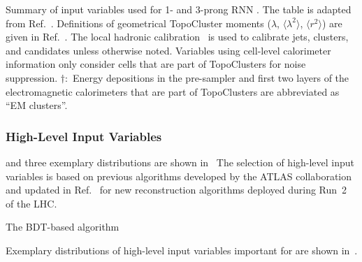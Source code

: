 \begin{table}[htbp]
  \centering

  \caption{Summary of input variables used for 1- and 3-prong RNN
    \tauid. The table is adapted from
    Ref.~\cite{ATL-PHYS-PUB-2019-033}. Definitions of geometrical
    TopoCluster moments ($\lambda$, $\langle \lambda^2 \rangle$,
    $\langle r^2 \rangle$) are given in Ref.~\cite{PERF-2014-07}. The
    local hadronic calibration~\cite{PERF-2014-07} is used to
    calibrate jets, clusters, and \tauhadvis candidates unless
    otherwise noted. Variables using cell-level calorimeter
    information only consider cells that are part of TopoClusters for
    noise suppression. $\dagger$:~Energy depositions in the
    pre-sampler and first two layers of the electromagnetic
    calorimeters that are part of TopoClusters are abbreviated as ``EM
    clusters''.}%
  \label{tab:tauid_input_variables}

  \resizebox{0.99\textwidth}{!}{
    
  }
\end{table}

\subsubsection{High-Level Input Variables}

and three exemplary distributions are shown
in~ The selection of high-level input
variables is based on previous \tauid algorithms developed by the
ATLAS collaboration~\cite{ATL-PHYS-PUB-2015-045} and updated in
Ref.~\cite{cdeutsch-master} for new \tauhadvis reconstruction
algorithms deployed during Run~2 of the LHC.

The BDT-based \tauid algorithm



Exemplary distributions of high-level input variables important for
\tauid are shown in~.


